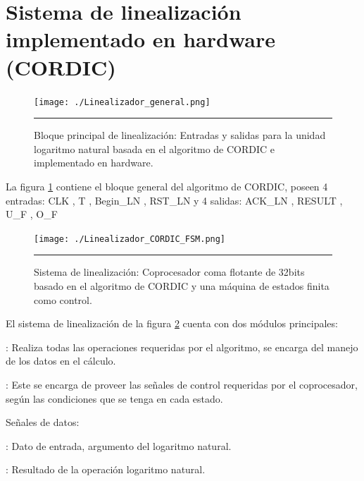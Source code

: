 \section{Sistema de linealización implementado en hardware (CORDIC)}

\begin{figure}[H]
  \centering
    \texttt{[image: ./Linealizador\_general.png]}
    \rule{35em}{0.5pt}
  \caption[Bloque principal de linealización: Entradas y salidas para la unidad logaritmo natural basada en el algoritmo de CORDIC e implementado en hardware]{Bloque principal de linealización: Entradas y salidas para la unidad logaritmo natural basada en el algoritmo de CORDIC e implementado en hardware. }
  \label{fig:CORDIC1}
\end{figure}

La figura \ref{fig:CORDIC1} contiene el bloque general del algoritmo de CORDIC, poseen 4 entradas: CLK , T , Begin\_LN , RST\_LN y 4 salidas: ACK\_LN , RESULT , U\_F , O\_F

\begin{figure}[H]
  \centering
    \texttt{[image: ./Linealizador\_CORDIC\_FSM.png]}
    \rule{35em}{0.5pt}
  \caption[Sistema de linealización: Coprocesador coma flotante de 32bits basado en el algoritmo de CORDIC y una máquina de estados finita como control ]{Sistema de linealización: Coprocesador coma flotante de 32bits basado en el algoritmo de CORDIC y una máquina de estados finita como control.}
  \label{fig:CORDIC2}
\end{figure}

El sistema de linealización de la figura \ref{fig:CORDIC2} cuenta con dos módulos principales: 

\begin{compactitem}

\item {}: Realiza todas las operaciones requeridas por el algoritmo, se encarga del manejo de los datos en el cálculo. 

\item {}: Este se encarga de proveer las señales de control requeridas por el coprocesador, según las condiciones que se tenga en cada estado.

\end{compactitem}

Señales de datos: 

\begin{compactitem}

\item {}: Dato de entrada, argumento del logaritmo natural. 
\item {}: Resultado de la operación logaritmo natural.

\end{compactitem}

